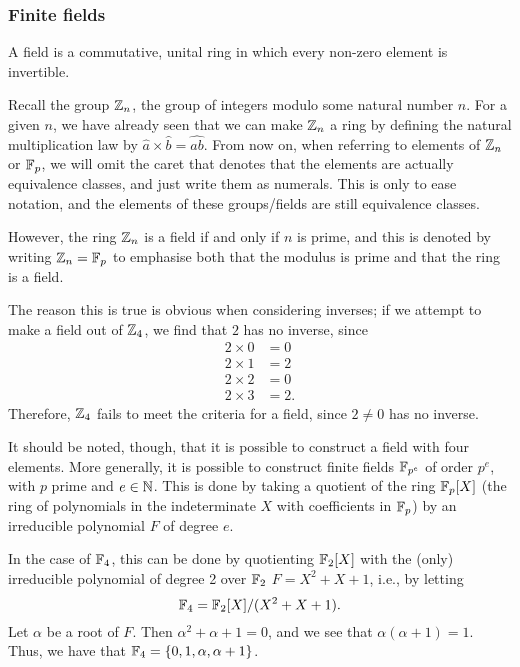 \subsubsection{Finite fields}
\begin{definition}
	A field is a commutative, unital ring in which every non-zero element is invertible.
\end{definition}
Recall the group $\zn$, the group of integers modulo some natural number $n$.
For a given $n$, we have already seen that we can make $\zn$ a ring by defining the natural multiplication law by $\widehat{a} \times \widehat{b} = \widehat{ab}$.
From now on, when referring to elements of $\zn$ or $\fp$, we will omit the caret that denotes that the elements are actually equivalence classes, and just write them as numerals.
This is only to ease notation, and the elements of these groups/fields are still equivalence classes.

However, the ring $\zn$ is a field if and only if $n$ is prime, and this is denoted by writing $\zn = \fp$ to emphasise both that the modulus is prime and that the ring is a field.

The reason this is true is obvious when considering inverses; if we attempt to make a field out of $\zn[4]$, we find that $2$ has no inverse, since
\begin{align*}
	2 \times 0 &= 0\\
	2 \times 1 &= 2\\
	2 \times 2 &= 0\\
	2 \times 3 &= 2.
\end{align*}
Therefore, $\zn[4]$ fails to meet the criteria for a field, since $2\neq 0$ has no inverse.

It should be noted, though, that it is possible to construct a field with four elements.
More generally, it is possible to construct finite fields $\fp[p^e]$ of order $p^e$, with $p$ prime and $e \in \N$.
This is done by taking a quotient of the ring $\fp[p] [X]$ (the ring of polynomials in the indeterminate $X$ with coefficients in $\fp$) by an irreducible polynomial $F$ of degree $e$.

In the case of $\fp[4]$, this can be done by quotienting $\fp[2] [X]$ with the (only) irreducible polynomial of degree 2 over $\fp[2]$ $F = X^2+X+1$, i.e., by letting
$$\fp[4] = \fp[2] [X] / (X^2 + X + 1).$$
Let $\alpha$ be a root of $F$.
Then $\alpha^2 + \alpha + 1 = 0$, and we see that $\alpha(\alpha +1) = 1$.
Thus, we have that $\fp[4] = \{0, 1, \alpha, \alpha + 1\}$.

